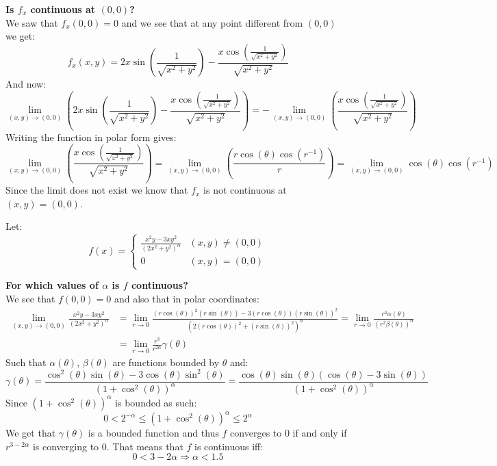 \documentclass[11pt,a4paper]{article}
\begin{document}
	\textbf{Is $f_x$ continuous at $(0,0)$?} \\
	We saw that $f_x(0,0) = 0$ and we see that at any point different
	from $(0,0)$ we get:
	\[
		f_x(x,y) = 2x\sin\left(\dfrac{1}{\sqrt{x^2+y^2}}\right)-
		\dfrac{x\cos\left(\frac{1}{\sqrt{x^2+y^2}}\right)}
		{\sqrt{x^2+y^2}}
	\]
	And now:
	\[
		\lim_{(x,y)\to(0,0)}{\left(2x\sin\left(\dfrac{1}{\sqrt{x^2+y^2}}\right)-\dfrac{x\cos\left(\frac{1}{\sqrt{x^2+y^2}}\right)}{\sqrt{x^2+y^2}}\right)} = 
		-\lim_{(x,y)\to(0,0)}{\left(\dfrac{x\cos\left(\frac{1}{\sqrt{x^2+y^2}}\right)}{\sqrt{x^2+y^2}}\right)}
	\]
	Writing the function in polar form gives:
	\[
		\lim_{(x,y)\to(0,0)}{\left(\dfrac{x\cos\left(\frac{1}{\sqrt{x^2+y^2}}\right)}{\sqrt{x^2+y^2}}\right)} = 
		\lim_{(x,y)\to(0,0)}{\left(\dfrac{r\cos(\theta)\cos(r^{-1})}{r}\right)} = 
		\lim_{(x,y)\to(0,0)}{\cos(\theta)\cos(r^{-1})}
	\]
	Since the limit does not exist we know that $f_x$ is not continuous
	at $(x,y) = (0,0)$.
	
	\newpage
	
	Let:
	\[
		f(x) = 
		\begin{cases}
			\frac{x^2y-3xy^2}{(2x^2+y^2)^\alpha} & (x,y) \neq (0,0) \\
			0 & (x,y) = (0,0)
		\end{cases}
	\]
	
	\textbf{For which values of $\alpha$ is $f$ continuous?} \\
	We see that $f(0,0) = 0$ and also that in polar coordinates:
	\begin{align*}
		\lim_{(x,y)\to (0,0)}
		{\frac{x^2y-3xy^2}{(2x^2+y^2)^\alpha}} &= 
		\lim_{r\to 0}
		{\frac{(r\cos(\theta))^2(r\sin(\theta))-3(r\cos(\theta))
		(r\sin(\theta))^2}{(2(r\cos(\theta))^2+(r\sin(\theta))^2)^\alpha}} = 
		\lim_{r\to 0}
		{\frac{r^3 \alpha(\theta)}{(r^2\beta(\theta))^\alpha}} \\ &=
		\lim_{r\to 0}
		{\frac{r^3}{r^{2\alpha}}\gamma(\theta)}
	\end{align*}
	Such that $\alpha(\theta)$, $\beta(\theta)$ are functions bounded by 
	$\theta$ and:
	\[
		\gamma(\theta) = 
		\frac
		{\cos^2(\theta)\sin(\theta) - 3\cos(\theta)\sin^2(\theta)}
		{(1+\cos^2(\theta))^\alpha} = 
		\frac
		{\cos(\theta)\sin(\theta)(\cos(\theta)-3\sin(\theta))}
		{(1+\cos^2(\theta))^\alpha}
	\]
	Since $(1+\cos^2(\theta))^\alpha$ is bounded as such:
	\[
		0 < 2^{-\alpha} \le (1+\cos^2(\theta))^\alpha \le 2^\alpha 
	\]
	We get that $\gamma(\theta)$ is a bounded function and thus
	$f$ converges to $0$ if and only if $r^{3-2\alpha}$ is converging
	to $0$. That means that $f$ is continuous iff:
	\[
		0 < 3-2\alpha \Rightarrow \boxed{\alpha < 1.5}
	\]
	
\end{document}
